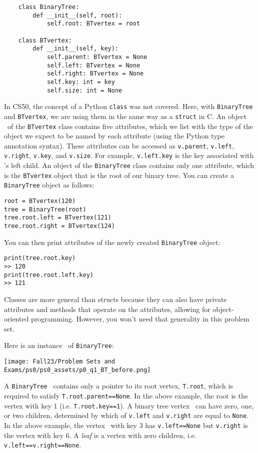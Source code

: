 \documentclass[11pt]{article}
\begin{document}
\begin{enumerate}
 \begin{verbatim}
    class BinaryTree:
        def __init__(self, root):
            self.root: BTvertex = root
 
    class BTvertex:
        def __init__(self, key):
            self.parent: BTvertex = None
            self.left: BTvertex = None
            self.right: BTvertex = None
            self.key: int = key
            self.size: int = None
 \end{verbatim}


 In CS50, the concept of a Python \texttt{class} was not covered. Here, with \texttt{BinaryTree} and \texttt{BTvertex}, we are using them in the same way as a \texttt{struct} in C. An object \btv\ of the \texttt{BTvertex} class contains five attributes, which we list with the type of the object we expect to be named by each attribute (using the Python type annotation syntax). These attributes can be accessed as \texttt{v.parent}, \texttt{v.left}, \texttt{v.right}, \texttt{v.key}, and \texttt{v.size}. 
 For example, \texttt{v.left.key} is the key associated with \btv's left child. An object of the \texttt{BinaryTree} class contains only one attribute, which is the \texttt{BTvertex} object that is the root of our binary tree. You can create a \texttt{BinaryTree} object as follows:
 
\begin{verbatim}
root = BTvertex(120)
tree = BinaryTree(root)
tree.root.left = BTvertex(121)
tree.root.right = BTvertex(124)
\end{verbatim}

You can then print attributes of the newly created \texttt{BinaryTree} object:
\begin{verbatim}
print(tree.root.key)
>> 120
print(tree.root.left.key)
>> 121
\end{verbatim}
 

 Classes are more general than structs because they can also have private attributes and methods that operate on the attributes, allowing for object-oriented programming. However, you won't need that generality in this problem set.

 Here is an instance \treeT\ of \texttt{BinaryTree}:
 
 \texttt{[image: Fall23/Problem Sets and Exams/ps0/ps0\_assets/p0\_q1\_BT\_before.png]}

 A \texttt{BinaryTree} \treeT\  contains only a pointer to its root vertex, \texttt{T.root}, which is required to satisfy \texttt{T.root.parent==None}. In the above example, 
 the root is the vertex with key 1 (i.e. \texttt{T.root.key==1}).
 A binary tree vertex \btv\ can have zero, one, or two children, determined by which of \texttt{v.left} and  \texttt{v.right} are equal to \texttt{None}.    In the above example, the vertex \btv\ with key 3 has 
 \texttt{v.left==None} but \texttt{v.right} is the vertex with key 6.
 A {\em leaf} is a vertex with zero children, i.e. \texttt{v.left==v.right==None}. 
 

\end{enumerate}
\end{document}
